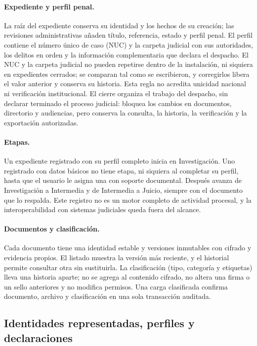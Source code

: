 \paragraph{Expediente y perfil penal.} La raíz del expediente conserva su identidad y los hechos de su creación; las revisiones administrativas añaden título, referencia, estado y perfil penal. El perfil contiene el número único de caso (NUC) y la carpeta judicial con sus autoridades, los delitos en orden y la información complementaria que declara el despacho. El NUC y la carpeta judicial no pueden repetirse dentro de la instalación, ni siquiera en expedientes cerrados; se comparan tal como se escribieron, y corregirlos libera el valor anterior y conserva su historia. Esta regla no acredita unicidad nacional ni verificación institucional. El cierre organiza el trabajo del despacho, sin declarar terminado el proceso judicial: bloquea los cambios en documentos, directorio y audiencias, pero conserva la consulta, la historia, la verificación y la exportación autorizadas.

\paragraph{Etapas.} Un expediente registrado con su perfil completo inicia en Investigación. Uno registrado con datos básicos no tiene etapa, ni siquiera al completar su perfil, hasta que el usuario le asigna una con soporte documental. Después avanza de Investigación a Intermedia y de Intermedia a Juicio, siempre con el documento que lo respalda. Este registro no es un motor completo de actividad procesal, y la interoperabilidad con sistemas judiciales queda fuera del alcance.

\paragraph{Documentos y clasificación.} Cada documento tiene una identidad estable y versiones inmutables con cifrado y evidencia propios. El listado muestra la versión más reciente, y el historial permite consultar otra sin sustituirla. La clasificación (tipo, categoría y etiquetas) lleva una historia aparte; no se agrega al contenido cifrado, no altera una firma o un sello anteriores y no modifica permisos. Una carga clasificada confirma documento, archivo y clasificación en una sola transacción auditada.

\subsection{Identidades representadas, perfiles y declaraciones}\label{sec:diseno-participantes-tipificados}

